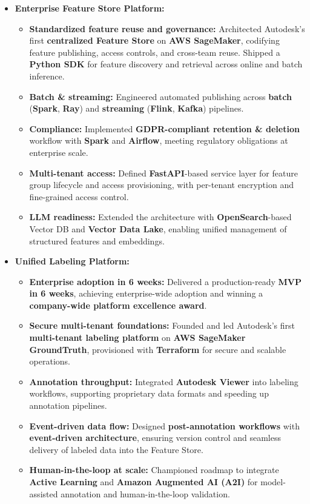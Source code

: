 \begin{itemize}[leftmargin=1.25em, topsep=1pt, partopsep=1.5pt]
\item \textbf{Enterprise Feature Store Platform:}
    \begin{itemize}[leftmargin=2.25em]
        \setlength\itemsep{0.2em}
        \item \textbf{Standardized feature reuse and governance:} Architected Autodesk’s first \textbf{centralized Feature Store} on \textbf{AWS SageMaker}, codifying feature publishing, access controls, and cross-team reuse. Shipped a \textbf{Python SDK} for feature discovery and retrieval across online and batch inference.
        \item \textbf{Batch \& streaming:} Engineered automated publishing across \textbf{batch} (\textbf{Spark}, \textbf{Ray}) and \textbf{streaming} (\textbf{Flink}, \textbf{Kafka}) pipelines.
        \item \textbf{Compliance:} Implemented \textbf{GDPR-compliant retention \& deletion} workflow with \textbf{Spark} and \textbf{Airflow}, meeting regulatory obligations at enterprise scale.
        \item \textbf{Multi-tenant access:} Defined \textbf{FastAPI}-based service layer for feature group lifecycle and access provisioning, with per-tenant encryption and fine-grained access control.
        \item \textbf{LLM readiness:} Extended the architecture with \textbf{OpenSearch}-based Vector DB and \textbf{Vector Data Lake}, enabling unified management of structured features and embeddings.
    \end{itemize}
\vspace{0.4em}

\item \textbf{Unified Labeling Platform:}
    \begin{itemize}[leftmargin=2.25em]
        \setlength\itemsep{0.2em}
        \item \textbf{Enterprise adoption in 6 weeks:} Delivered a production-ready \textbf{MVP in 6 weeks}, achieving enterprise-wide adoption and winning a \textbf{company-wide platform excellence award}.
        \item \textbf{Secure multi-tenant foundations:} Founded and led Autodesk’s first \textbf{multi-tenant labeling platform} on \textbf{AWS SageMaker GroundTruth}, provisioned with \textbf{Terraform} for secure and scalable operations.
        \item \textbf{Annotation throughput:} Integrated \textbf{Autodesk Viewer} into labeling workflows, supporting proprietary data formats and speeding up annotation pipelines.
        \item \textbf{Event-driven data flow:} Designed \textbf{post-annotation workflows} with \textbf{event-driven architecture}, ensuring version control and seamless delivery of labeled data into the Feature Store.
        \item \textbf{Human-in-the-loop at scale:} Championed roadmap to integrate \textbf{Active Learning} and \textbf{Amazon Augmented AI (A2I)} for model-assisted annotation and human-in-the-loop validation.
    \end{itemize}
\vspace{0.4em}


\end{itemize}

